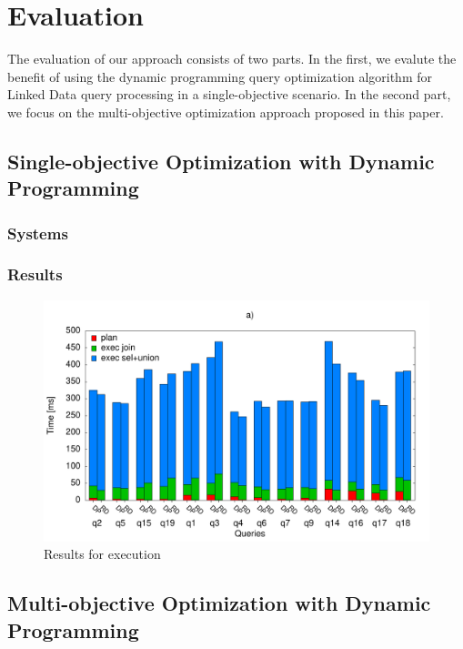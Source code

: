 \section{Evaluation}
\label{sec:eva}

The evaluation of our approach consists of two parts. In the first, we
evalute the benefit of using the dynamic programming query
optimization algorithm for Linked Data query processing in a
single-objective scenario. In the second part, we focus on the
multi-objective optimization approach proposed in this paper.

\subsection{Single-objective Optimization with Dynamic Programming}

\subsubsection{Systems}


\subsubsection{Results}



\begin{figure}[htb]
  \centering
  \includegraphics[width=\linewidth]{figs/exec_queries.pdf}
  \caption{Results for execution}
  \label{fig:exec_queries}
\end{figure}


\subsection{Multi-objective Optimization with Dynamic Programming}

